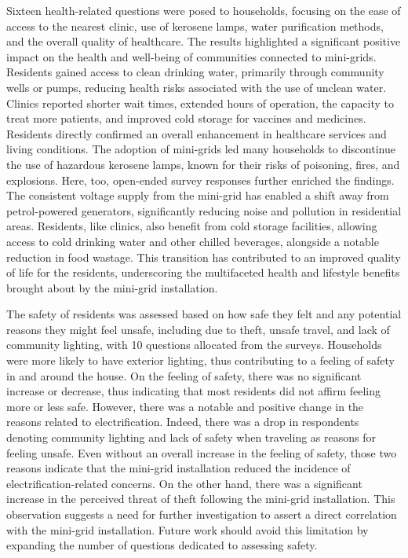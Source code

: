 Sixteen health-related questions were posed to households, focusing on the ease of access to the nearest clinic, use of kerosene lamps, water purification methods, and the overall quality of healthcare. The results highlighted a significant positive impact on the health and well-being of communities connected to mini-grids. Residents gained access to clean drinking water, primarily through community wells or pumps, reducing health risks associated with the use of unclean water.
Clinics reported shorter wait times, extended hours of operation, the capacity to treat more patients, and improved cold storage for vaccines and medicines. Residents directly confirmed an overall enhancement in healthcare services and living conditions.
The adoption of mini-grids led many households to discontinue the use of hazardous kerosene lamps, known for their risks of poisoning, fires, and explosions. Here, too, open-ended survey responses further enriched the findings. The consistent voltage supply from the mini-grid has enabled a shift away from petrol-powered generators, significantly reducing noise and pollution in residential areas. Residents, like clinics, also benefit from cold storage facilities, allowing access to cold drinking water and other chilled beverages, alongside a notable reduction in food wastage. This transition has contributed to an improved quality of life for the residents, underscoring the multifaceted health and lifestyle benefits brought about by the mini-grid installation.

The safety of residents was assessed based on how safe they felt and any potential reasons they might feel unsafe, including due to theft, unsafe travel, and lack of community lighting, with 10 questions allocated from the surveys. Households were more likely to have exterior lighting, thus contributing to a feeling of safety in and around the house. On the feeling of safety, there was no significant increase or decrease, thus indicating that most residents did not affirm feeling more or less safe. However, there was a notable and positive change in the reasons related to electrification. Indeed, there was a drop in respondents denoting community lighting and lack of safety when traveling as reasons for feeling unsafe. Even without an overall increase in the feeling of safety, those two reasons indicate that the mini-grid installation reduced the incidence of electrification-related concerns. On the other hand, there was a significant increase in the perceived threat of theft following the mini-grid installation. This observation suggests a need for further investigation to assert a direct correlation with the mini-grid installation. Future work should avoid this limitation by expanding the number of questions dedicated to assessing safety.

